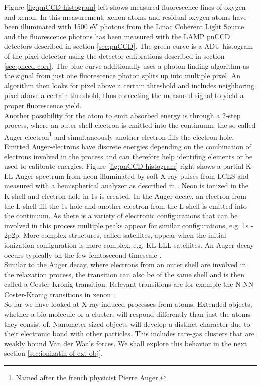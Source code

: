 Figure \ref{fig:pnCCD-histogram} left shows measured fluorescence lines of oxygen and xenon. In this measurement, xenon atoms and residual oxygen atoms have been illuminated with 1500 eV photons from the Linac Coherent Light Source and the fluorescence photons has been measured with the LAMP pnCCD detectors described in section \ref{sec:pnCCD}. The green curve is a ADU histogram of the pixel-detector using the detector calibrations described in section \ref{sec:pnccd-corr}. The blue curve additionally uses a photon-finding algorithm as the signal from just one fluorescence photon splits up into multiple pixel. An algorithm then looks for pixel above a certain threshold and includes neighboring pixel above a certain threshold, thus correcting the measured signal to yield a proper fluorescence yield.\\
Another possibility for the atom to emit absorbed energy is through a 2-step process, where an outer shell electron is emitted into the continuum, the so called Auger-electron\footnote{Named after the french physicist Pierre Auger.} and simultaneously another electron fills the electron-hole. Emitted Auger-electrons have discrete energies depending on the combination of electrons involved in the process and can therefore help identifing elements or be used to calibrate energies. Figure \ref{fig:pnCCD-histogram} right shows a partial K-LL Auger spectrum from neon illuminated by soft X-ray pulses from LCLS and measured with a hemispherical analyzer as described in \citep{Bucher-2014-Unpublished}. Neon is ionized in the K-shell and electron-hole in 1s is created. In the Auger decay, an electron from the L-shell fill the 1s hole and another electron from the L-shell is emitted into the continuum. As there is a variety of electronic configurations that can be involved in this process multiple peaks appear for similar configurations, e.g. 1s - 2p2p. More complex structures, called satellites, appear when the initial ionization configuration is more complex, e.g. KL-LLL satellites. An Auger decay occurs typically on the few femtosecond timescale \citep{Krause-1970-PhysLettA}.\\
Similar to the Auger decay, where electrons from an outer shell are involved in the relaxation process, the transition can also be of the same shell and is then called a Coster-Kronig transition. Relevant transitions are for example the N-NN Coster-Kronig transitions in xenon \citep{Coster-1935-Physica}.
\\
So far we have looked at X-ray induced processes from atoms. Extended objects, whether a bio-molecule or a cluster, will respond differently than just the atoms they consist of. Nanometer-sized objects will develop a distinct character due to their electronic bond with other particles. This includes rare-gas clusters that are weakly bound Van der Waals forces. We shall explore this behavior in the next section \ref{sec:ionizatin-of-ext-obj}.
%
%
%
%

